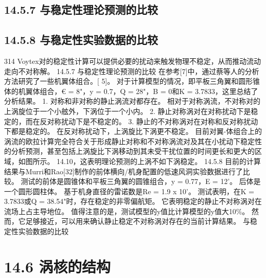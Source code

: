 \documentclass[UTF8,11pt,a4paper,openany,fontset=fandol]{ctexbook}
\begin{document}
\subsection{14.5.7 与稳定性理论预测的比较}
\subsection{14.5.8 与稳定性实验数据的比较}
314 Voytex对的稳定性计算可以提供必要的扰动来触发物理不稳定，从而推动流动走向不对称解。 14.5.7 与稳定性理论预测的比较 在参考[7]中，通过蔡等人的分析方法研究了一些机翼体组合。[ 5]。 对于计算模型的情况，即平板三角翼和圆形锥体的机翼体组合，€ = 8"，y = 0.7，Q = 28"，B = 0和K = 3.7833，这里总结了分析结果。 1. 对称和非对称的静止涡流对都存在。 相对于对称涡流，不对称对的上涡旋位于一个小舷外，下涡位于一个小内。 2. 静止对称涡对在对称扰动下是稳定的，而在反对称扰动下是不稳定的。 3. 静止的不对称涡对在对称和反对称扰动下都是稳定的。 在反对称扰动下，上涡旋比下涡更不稳定。 目前对翼-体组合上的涡流的欧拉计算完全符合关于形成静止对称和不对称涡流对及其在小扰动下稳定性的分析预测，甚至包括上涡旋比下涡移动到其未受干扰位置的时间更长和更大的区域，如图所示。 14.10，这表明理论预测的上涡不如下涡稳定。 14.5.8 目前的计算结果与Murri和Rao[32]制作的前体横向/机身配置的低速风洞实验数据进行了比较。 测试的前体是圆锥体和平板三角翼的圆锥组合，y = 0.77，E = 12'。 后体是一个圆形圆柱体。 基于机身直径的雷诺数是Re = 1.9 x 10'。 测试表明，在K = 3.7833或Q = 38.54"时，存在稳定的非零偏航矩。 它表明稳定的静止不对称涡对在流场上占主导地位。 值得注意的是，测试模型的y值比计算模型的y值大10\%。 然而，它足够接近，可以用来确认静止稳定不对称涡对存在的当前计算结果。 与稳定性实验数据的比较

\section{14.6 涡核的结构}
\end{document}
